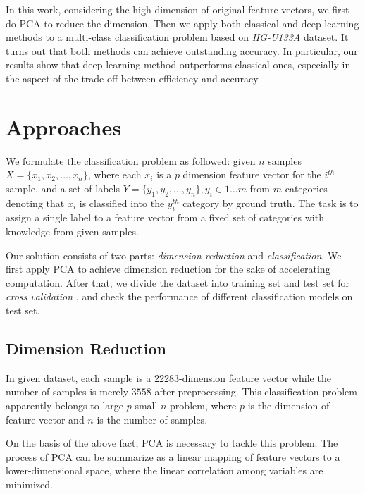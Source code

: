 \documentclass[10pt,twocolumn,letterpaper]{article}
\begin{document}
	In this work, considering the high dimension of original feature vectors, we first do PCA to reduce the dimension. Then we apply both classical and deep learning methods to a multi-class classification problem based on \textit{HG-U133A} dataset. It turns out that both methods can achieve outstanding accuracy. In particular, our results show that deep learning method outperforms classical ones, especially in the aspect of the trade-off between efficiency and accuracy.

\section{Approaches}
\label{sec:approaches}
	We formulate the classification problem as followed: given $n$ samples $X = \{x_1, x_2, \dots, x_n\}$, where each $x_i$ is a $p$ dimension feature vector for the $i^{th}$ sample, and a set of labels $Y = \{y_1, y_2, \dots, y_n\}, y_i \in 1 \dots m$ from $m$ categories denoting that $x_i$ is classified into the $y_i^{th}$ category by ground truth. The task is to assign a single label to a feature vector from a fixed set of categories with knowledge from given samples.

	Our solution consists of two parts: \emph{dimension reduction} and \emph{classification}. We first apply PCA to achieve dimension reduction for the sake of accelerating computation. After that, we divide the dataset into training set and test set for \textit{cross validation} \cite{crossValidation}, and check the performance of different classification models on test set.
	
\subsection{Dimension Reduction}
	In given dataset, each sample is a 22283-dimension feature vector while the number of samples is merely $3558$ after preprocessing. This classification problem apparently belongs to large $p$ small $n$ problem, where $p$ is the dimension of feature vector and $n$ is the number of samples.
	
	On the basis of the above fact, PCA is necessary to tackle this problem. The process of PCA can be summarize as a linear mapping of feature vectors to a lower-dimensional space, where the linear correlation among variables are minimized.
	
\end{document}
